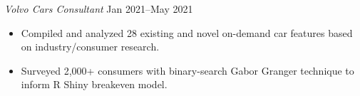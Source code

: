 \textit{Volvo Cars Consultant} \hfill Jan 2021--May 2021
\begin{itemize}
	\item Compiled and analyzed 28 existing and novel on-demand car features based on industry/consumer research.
	\item Surveyed 2,000+ consumers with binary-search Gabor Granger technique to inform R Shiny breakeven model.
\end{itemize}\par